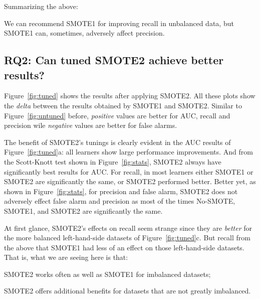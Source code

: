 
\noindent
Summarizing the above:
\begin{lesson1}
We can recommend SMOTE1 for improving recall in unbalanced data, but SMOTE1 can,
sometimes, adversely affect
precision.
\end{lesson1}

\subsection{\textbf{RQ2: Can tuned SMOTE2 achieve better results?}}

Figure~\ref{fig:tuned} shows the results
after applying SMOTE2. All these
plots show the {\em delta} between
the results obtained by SMOTE1 and SMOTE2.
Similar to Figure~\ref{fig:untuned} before, {\em positive}  values
are better for AUC, recall and precision
wile {\em negative} values are better for false alarms.

The benefit of SMOTE2's tunings is clearly evident in the AUC results of  Figure~\ref{fig:tuned}a:
all learners show large performance improvements. And from the Scott-Knott test shown in Figure~\ref{fig:stats}, SMOTE2 always have significantly best results for AUC. For recall, in most learners either SMOTE1 or SMOTE2 are significantly the same, or SMOTE2 performed better. 
Better yet,  as
shown in
Figure~\ref{fig:stats}, for precision and false alarm, SMOTE2 does
not adversely effect false alarm and precision as most of the times No-SMOTE, SMOTE1, and SMOTE2 are significantly the same.


At first glance, SMOTE2's effects on recall seem strange since they are
{\em better} for the more balanced left-hand-side datasets of
Figure~\ref{fig:tuned}c.  But recall from the above that SMOTE1 had less
of an effect on those left-hand-side datasets. That is, what we are seeing
here is that:
\bi
\item
SMOTE2 works often as well as SMOTE1 for imbalanced datasets;
\item
SMOTE2 offers additional benefits for datasets that are not greatly
imbalanced.
\ei

